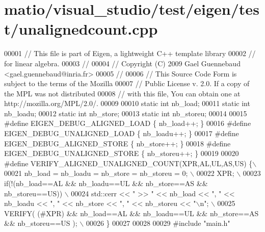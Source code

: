 \hypertarget{matio_2visual__studio_2test_2eigen_2test_2unalignedcount_8cpp_source}{}\section{matio/visual\+\_\+studio/test/eigen/test/unalignedcount.cpp}
\label{matio_2visual__studio_2test_2eigen_2test_2unalignedcount_8cpp_source}

\begin{DoxyCode}
00001 \textcolor{comment}{// This file is part of Eigen, a lightweight C++ template library}
00002 \textcolor{comment}{// for linear algebra.}
00003 \textcolor{comment}{//}
00004 \textcolor{comment}{// Copyright (C) 2009 Gael Guennebaud <gael.guennebaud@inria.fr>}
00005 \textcolor{comment}{//}
00006 \textcolor{comment}{// This Source Code Form is subject to the terms of the Mozilla}
00007 \textcolor{comment}{// Public License v. 2.0. If a copy of the MPL was not distributed}
00008 \textcolor{comment}{// with this file, You can obtain one at http://mozilla.org/MPL/2.0/.}
00009 
00010 \textcolor{keyword}{static} \textcolor{keywordtype}{int} nb\_load;
00011 \textcolor{keyword}{static} \textcolor{keywordtype}{int} nb\_loadu;
00012 \textcolor{keyword}{static} \textcolor{keywordtype}{int} nb\_store;
00013 \textcolor{keyword}{static} \textcolor{keywordtype}{int} nb\_storeu;
00014 
00015 \textcolor{preprocessor}{#define EIGEN\_DEBUG\_ALIGNED\_LOAD    \{ nb\_load++;    \}}
00016 \textcolor{preprocessor}{#define EIGEN\_DEBUG\_UNALIGNED\_LOAD  \{ nb\_loadu++;   \}}
00017 \textcolor{preprocessor}{#define EIGEN\_DEBUG\_ALIGNED\_STORE   \{ nb\_store++;   \}}
00018 \textcolor{preprocessor}{#define EIGEN\_DEBUG\_UNALIGNED\_STORE \{ nb\_storeu++;  \}}
00019 
00020 \textcolor{preprocessor}{#define VERIFY\_ALIGNED\_UNALIGNED\_COUNT(XPR,AL,UL,AS,US) \{\(\backslash\)}
00021 \textcolor{preprocessor}{    nb\_load = nb\_loadu = nb\_store = nb\_storeu = 0; \(\backslash\)}
00022 \textcolor{preprocessor}{    XPR; \(\backslash\)}
00023 \textcolor{preprocessor}{    if(!(nb\_load==AL && nb\_loadu==UL && nb\_store==AS && nb\_storeu==US)) \(\backslash\)}
00024 \textcolor{preprocessor}{      std::cerr << " >> " << nb\_load << ", " << nb\_loadu << ", " << nb\_store << ", " << nb\_storeu << "\(\backslash\)n"; 
      \(\backslash\)}
00025 \textcolor{preprocessor}{    VERIFY( (#XPR) && nb\_load==AL && nb\_loadu==UL && nb\_store==AS && nb\_storeu==US ); \(\backslash\)}
00026 \textcolor{preprocessor}{  \}}
00027 
00028 
00029 \textcolor{preprocessor}{#include "main.h"}

\end{DoxyCode}
